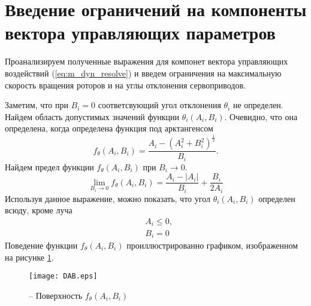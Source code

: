 \section{Введение ограничений на компоненты вектора управляющих параметров}

Проанализируем полученные выражения для компонет вектора управляющих воздействий (\ref{eq:m_dyn_resolve}) и введем ограничения на максимальную скорость вращения роторов и на углы отклонения сервоприводов.

Заметим, что при $B_i = 0$ соответсвующий угол отклонения $\theta_i$ не определен. Найдем область допустимых значений функции $\theta_i(A_i, B_i)$. Очевидно, что она определена, когда определена функция под арктангенсом
\begin{equation}
f_{\theta}(A_i, B_i) = \frac{A_i-(A^2_i +  B^2_i)^{\frac{1}{2}}}{B_i}.
\end{equation}
Найдем предел функции $f_{\theta}(A_i, B_i)$ при $B_i \to 0$.
\begin{equation}
\lim_{B_i \to 0} f_{\theta}(A_i, B_i) =
\frac{{A_i} - |A_i|}{B_i} + 
\frac{B_i}{2A_i}
\end{equation}
Используя данное выражение, можно показать, что угол $\theta_i(A_i, B_i)$ определен всюду, кроме луча
\begin{equation} \label{m_theta_exists}
\begin{aligned}
&A_i \leq 0, \\
&B_i = 0
\end{aligned}
\end{equation}
Поведение функции $f_{\theta}(A_i, B_i)$ проиллюстрированно графиком, изображенном на рисунке \ref{fig:f_th}.
\begin{figure}[h!]
	\centering
	\texttt{[image: DAB.eps]}
	\caption{ -- Поверхность $f_{\theta}(A_i, B_i)$}
	\label{fig:f_th}
\end{figure}


